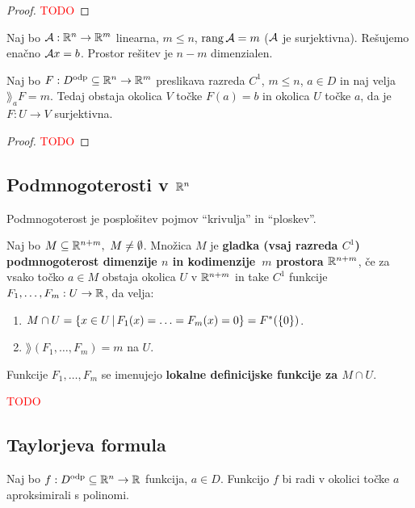 \begin{proof}
    \textcolor{red}{TODO}
\end{proof}

\begin{primer}
    Naj bo $\mathcal{A}: \mathbb{R}^n \to \mathbb{R}^m$ linearna, $m \leq n$, $\operatorname{rang} \mathcal{A} = m$ ($\mathcal{A}$ je surjektivna). Rešujemo enačno $\mathcal{A}x=b$. Prostor rešitev je $n-m$ dimenzialen.
\end{primer}

\begin{posledica}
    Naj bo $F: D^\text{odp} \subseteq \mathbb{R}^n \to \mathbb{R}^m$ preslikava razreda $C^1$, $m \leq n$, $a \in D$ in naj velja $\rang_aF=m$. Tedaj obstaja okolica $V$ točke $F(a) = b$ in okolica $U$ točke $a$, da je $F: U \to V$ surjektivna.
\end{posledica}

\begin{proof}
    \textcolor{red}{TODO}
\end{proof}

\subsection{Podmnogoterosti v $\mathbb{R}^n$}
Podmnogoterost je posplošitev pojmov "`krivulja"' in "`ploskev"'.

\begin{definicija}
    Naj bo $M \subseteq \mathbb{R}^{n+m}, \ M \neq \emptyset$. Množica $M$ je \textbf{gladka (vsaj razreda $C^1$) podmnogoterost dimenzije $n$ in kodimenzije~$m$ prostora $\mathbb{R}^{n+m}$}, če 
    za vsako točko $a \in M$ obstaja okolica $U$ v $\mathbb{R}^{n+m}$ in take $C^1$ funkcije $F_1, \ldots, F_m: U \to \mathbb{R}$, da velja:
    \begin{enumerate}
        \item $M \cap U = \left\{x \in U \,|\, F_1(x) = \ldots = F_m(x) = 0\right\} = F^*(\left\{0\right\})$.
        \item $\rang(F_1, \ldots, F_m) = m$ na $U$.
    \end{enumerate}
\end{definicija}

\begin{opomba}
    Funkcije $F_1, \ldots, F_m$ se imenujejo \textbf{lokalne definicijske funkcije za $M \cap U$}.
\end{opomba}

\textcolor{red}{TODO}

\newpage
\subsection{Taylorjeva formula}
Naj bo $f: D^{\text{odp}} \subseteq \mathbb{R}^n \to \mathbb{R}$ funkcija, $a \in D$. Funkcijo $f$ bi radi v okolici točke $a$ aproksimirali s polinomi.

